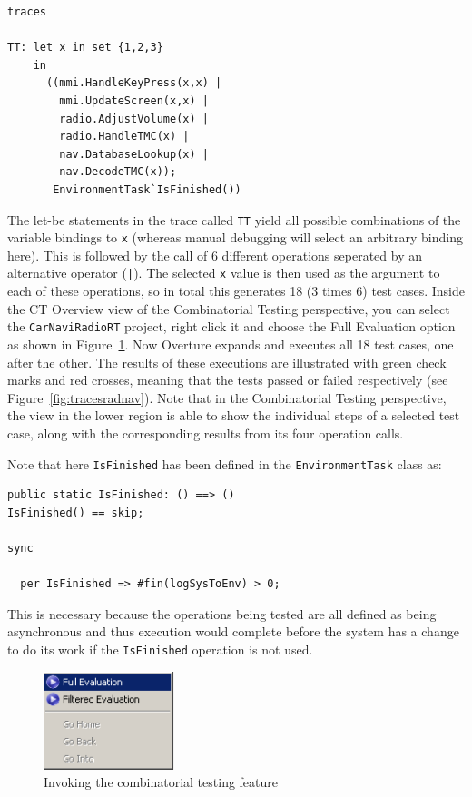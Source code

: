 \begin{lstlisting}
traces

TT: let x in set {1,2,3}
    in
      ((mmi.HandleKeyPress(x,x) | 
        mmi.UpdateScreen(x,x) | 
        radio.AdjustVolume(x) |
        radio.HandleTMC(x) |
        nav.DatabaseLookup(x) |
        nav.DecodeTMC(x));
       EnvironmentTask`IsFinished())
 \end{lstlisting}

\noindent The let-be statements in the trace called
\texttt{TT} yield all possible combinations of the variable
bindings to \texttt{x} (whereas manual debugging will select an
arbitrary binding here). This is followed by the call of 6 different
operations seperated by an alternative operator (\texttt{|}). The
selected \texttt{x} value is then used as the argument to each of these
operations, so in total this generates 18 (3 times 6) test cases. 
Inside the CT Overview view of the Combinatorial Testing perspective, you can
select the \texttt{CarNaviRadioRT} project, right click it and 
choose the \textsf{Full
  Evaluation} option as shown in Figure~\ref{fig:CToptions}. 
Now Overture expands
and executes all 18 test cases, one after the other. The results of these
executions are illustrated with green check marks and red crosses, meaning that
the tests passed or failed respectively (see Figure~\ref{fig:tracesradnav}). Note
that in the Combinatorial Testing perspective, the view in the lower region is
able to show the individual steps of a selected test case, along with the
corresponding results from its four operation calls.

Note that here \texttt{IsFinished} has been defined in the
\texttt{EnvironmentTask} class as:

\begin{lstlisting}
public static IsFinished: () ==> ()
IsFinished() == skip;

sync

  per IsFinished => #fin(logSysToEnv) > 0;
\end{lstlisting}
This is necessary because the operations being tested are all defined
as being asynchronous and thus execution would complete before the
system has a change to do its work if the \texttt{IsFinished}
operation is not used.

\begin{figure}[htbp]
\begin{center}
\includegraphics[width=1.5in]{figures/CToptions}
\caption{Invoking the combinatorial testing feature\label{fig:CToptions}}
\end{center}
\end{figure}

